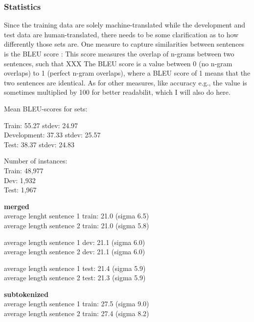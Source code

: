 \subsubsection{Statistics}

Since the training data are solely machine-translated while the development and test data are
human-translated, there needs to be some clarification as to how differently those sets are.
One measure to capture similarities between sentences is the BLEU score \cite{papineni2002bleu}:
This score measures the overlap of n-grams between two sentences, such that XXX
The BLEU score is a value between 0 (no n-gram overlaps) to 1 (perfect n-gram overlaps), where a
BLEU score of 1 means that the two sentences are identical. As for other measures, like accuracy
e.g., the value is sometimes multiplied by 100 for better readabilit, which I will also do here.



Mean BLEU-scores for sets:

Train: 55.27 stdev: 24.97\\
Development: 37.33 stdev: 25.57\\
Test: 38.37 stdev: 24.83




Number of instances: \\
Train: 48,977 \\
Dev: 1,932 \\
Test: 1,967

\textbf{merged} \\
average lenght sentence 1 train: 21.0 (sigma 6.5) \\
average length sentence 2 train: 21.0 (sigma 5.8)

average length sentence 1 dev: 21.1 (sigma 6.0) \\
average length sentence 2 dev: 21.1 (sigma 6.0)

average length sentence 1 test: 21.4 (sigma 5.9) \\
average length sentence 2 test: 21.3 (sigma 5.9)

\textbf{subtokenized} \\
average length sentence 1 train: 27.5 (sigma 9.0) \\
average length sentence 2 train: 27.4 (sigma 8.2)


